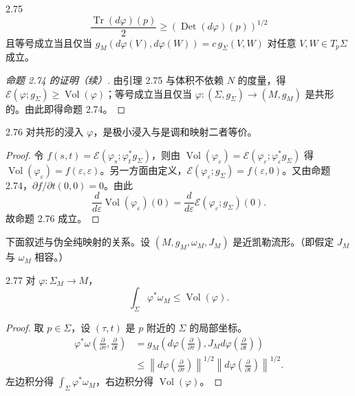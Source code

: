 \begin{lemma}{2.75}
  \[
    \frac{\operatorname{Tr}(d\varphi)(p)}{2}\ge\left(\operatorname{Det}(d\varphi)(p)\right)^{1/2}
  \]
  且等号成立当且仅当 $g_M(d\varphi(V),d\varphi(W))=c\,g_\Sigma(V,W)$ 对任意 $V,W\in T_p\Sigma$ 成立。
\end{lemma}

\begin{proof}[命题 2.74 的证明（续）]
  由引理 2.75 与体积不依赖 $N$ 的度量，得 $\mathcal{E}(\varphi;g_\Sigma)\ge\operatorname{Vol}(\varphi)$；等号成立当且仅当 $\varphi\colon(\Sigma,g_\Sigma)\to(M,g_M)$ 是共形的。由此即得命题 2.74。
\end{proof}

\begin{proposition*}{2.76}
  对共形的浸入 $\varphi$，是极小浸入与是调和映射二者等价。
\end{proposition*}

\begin{proof}
  令 $f(s,t)=\mathcal{E}(\varphi_s;\varphi_t^*g_\Sigma)$，则由 $\operatorname{Vol}(\varphi_\varepsilon)=\mathcal{E}(\varphi_\varepsilon;\varphi_\varepsilon^*g_\Sigma)$ 得 $\operatorname{Vol}(\varphi_\varepsilon)=f(\varepsilon,\varepsilon)$。另一方面由定义，$\mathcal{E}(\varphi_\varepsilon;g_\Sigma)=f(\varepsilon,0)$。又由命题 2.74，$\partial f/\partial t(0,0)=0$。由此
  \[
    \frac{d}{d\varepsilon}\operatorname{Vol}(\varphi_\varepsilon)(0)
    =\frac{d}{d\varepsilon}\mathcal{E}(\varphi_\varepsilon;g_\Sigma)(0).
  \]
  故命题 2.76 成立。
\end{proof}


下面叙述与伪全纯映射的关系。设 $(M,g_M,\omega_M,J_M)$ 是近凯勒流形。（即假定 $J_M$ 与 $\omega_M$ 相容。）

\begin{lemma*}{2.77}
  对 $\varphi\colon\Sigma_M\to M$，
  \[
    \int_\Sigma\varphi^*\omega_M\le\operatorname{Vol}(\varphi).
  \]
\end{lemma*}

\begin{proof}
  取 $p\in\Sigma$，设 $(\tau,t)$ 是 $p$ 附近的 $\Sigma$ 的局部坐标。
  \begin{equation}
  \begin{aligned}
    \varphi^*\omega\left(\frac{\partial}{\partial\tau},\frac{\partial}{\partial t}\right)
    &=g_M\left(d\varphi\left(\frac{\partial}{\partial\tau}\right),
      J_Md\varphi\left(\frac{\partial}{\partial t}\right)\right)\\
    &\le\left\|d\varphi\left(\frac{\partial}{\partial\tau}\right)\right\|^{1/2}
      \left\|d\varphi\left(\frac{\partial}{\partial t}\right)\right\|^{1/2}.
  \end{aligned}
  \tag{2.26}
  \end{equation}
  左边积分得 $\int_\Sigma\varphi^*\omega_M$，右边积分得 $\operatorname{Vol}(\varphi)$。
\end{proof}

